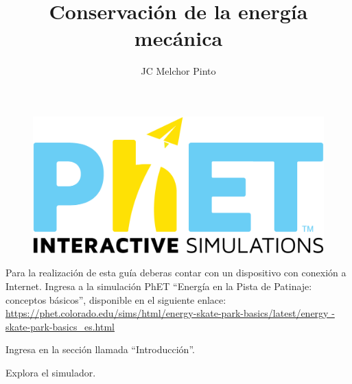 \documentclass[12pt,addpoints,answers]{guia}
\title{Conservación de la energía mecánica}
\author{JC Melchor Pinto}
\begin{document}
\INFO%
\begin{opening}
    {
    \vspace{-0.7cm}
    \begin{figure}[H]
        \centering
        \includegraphics[width=.12\linewidth]{../images/phet}
    \end{figure}
    Para la realización de esta guía deberas contar con un dispositivo con
    conexión a Internet. Ingresa a la simulación PhET ``Energía en la Pista de
    Patinaje: conceptos básicos'', disponible en el siguiente enlace: \\
    {
    \small
    \url{https://phet.colorado.edu/sims/html/energy-skate-park-basics/latest/energy
        -skate-park-basics_es.html}
    }\\
    \begin{center}
        \begin{minipage}{0.8\textwidth}
            \begin{minipage}{.1\linewidth}
                \color{colorrds}\huge\faHome
            \end{minipage}%
            \begin{minipage}{.90\linewidth}
                \begin{tcolorbox}[width=\linewidth ,halign=left,colframe=rdsdark,arc=3mm, sharp corners=west]
                    Ingresa en la sección llamada ``Introducción''.\\
                \end{tcolorbox}
            \end{minipage}
        \end{minipage}

        \begin{minipage}{0.8\textwidth}
            \begin{minipage}{.1\linewidth}
                \color{colorrds}\huge\faSearch
            \end{minipage}%
            \begin{minipage}{.9\linewidth}
                \begin{tcolorbox}[width=\linewidth,halign=left,colframe=rdsdark,arc=3mm, sharp corners=west]
                    Explora el simulador.\\
                \end{tcolorbox}
            \end{minipage}
        \end{minipage}


\end{center}}
\end{opening}
\end{document}
